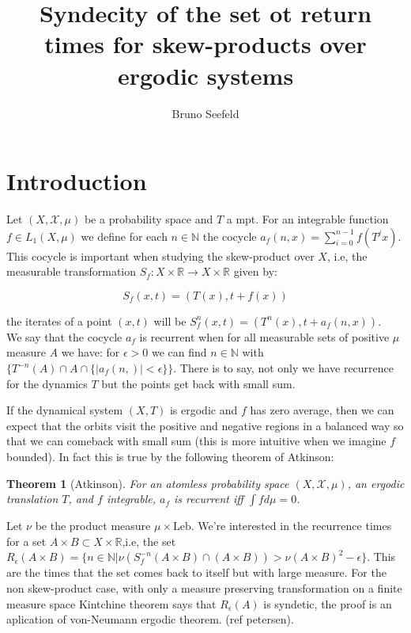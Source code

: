 \documentclass{article}
\title{Syndecity of the set ot return times for skew-products over
ergodic systems}
\author{Bruno Seefeld}
\newtheorem{theorem}{Theorem}[section]
\begin{document}
\maketitle


\begin{abstract}

\end{abstract}


\section{Introduction}

Let $(X,\mathcal{X},\mu)$ be a probability space and $T$ a mpt.
For an integrable function $f\in L_1(X,\mu)$ we define for each $n\in
\mathbb{N}$ the cocycle $a_f(n,x)=\sum_{i=0}^{n-1}f(T^j x)$.
This cocycle is important when studying the skew-product over $X$,
i.e, the measurable transformation $S_f:X\times\mathbb{R}\to X\times\mathbb{R}$
given by:

\begin{equation}
S_f(x,t)=(T(x),t+f(x))
\end{equation}


the iterates of a point $(x,t)$ will be $S_f^n(x,t)=(T^n(x),t+a_f(n,x))$.
\\

We say that the cocycle $a_f$ is recurrent when for all measurable
sets of positive $\mu$ measure $A$ we have: for $\epsilon>0$ we can
find $n\in\mathbb{N}$ with $\{T^{-n}(A)\cap A\cap \{|a_f(n,)|<\epsilon\}\}$.
There is to say, not only we have recurrence for the dynamics $T$ but
the points get back with small sum. 

If the dynamical system $(X,T)$ is ergodic and $f$ has zero average,
then we can expect that the orbits visit the positive and negative 
regions in a balanced way so that we can comeback with small sum (this is
more intuitive when we imagine $f$ bounded). In fact this is true by
the following theorem of Atkinson:


\begin{theorem}[Atkinson] \label{theorem:Atkinson}
    For an atomless probability space $(X,\mathcal{X},\mu)$, an ergodic translation $T$,
    and $f$ integrable, $a_f$ is recurrent iff $\int f d\mu=0$.
\end{theorem}


Let $\nu$ be the product measure $\mu\times \text{Leb}$. We're interested in the recurrence times for a set $A\times B\subset 
X\times \mathbb{R}$,i.e, the set $R_\epsilon (A\times B)=\{n\in\mathbb{N}|
\nu(S_f^{-n}(A\times B)\cap(A\times B))>\nu (A\times B)^2-\epsilon\}$.  This
are the times that the set comes back to itself but with large  measure.
For the non skew-product case, with only a measure preserving transformation
on a finite measure space Kintchine theorem says that $R_\epsilon(A)$
is syndetic, the proof is an aplication of von-Neumann ergodic theorem.
(ref petersen).
\\
\end{document}
